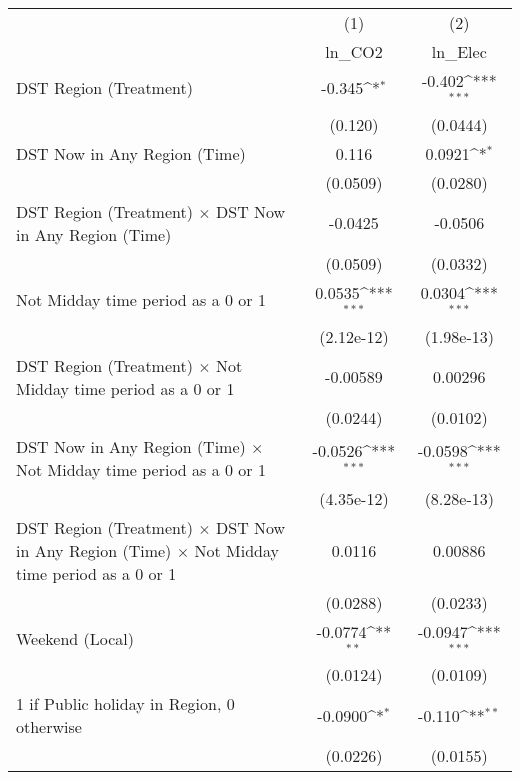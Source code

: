 {
\def\sym#1{\ifmmode^{#1}\else\(^{#1}\)\fi}
\begin{tabular}{l*{2}{c}}
\hline\hline
                    &\multicolumn{1}{c}{(1)}&\multicolumn{1}{c}{(2)}\\
                    &\multicolumn{1}{c}{ln\_CO2}&\multicolumn{1}{c}{ln\_Elec}\\
\hline
DST Region (Treatment)&      -0.345\sym{*}  &      -0.402\sym{***}\\
                    &     (0.120)         &    (0.0444)         \\
[1em]
DST Now in Any Region (Time)&       0.116         &      0.0921\sym{*}  \\
                    &    (0.0509)         &    (0.0280)         \\
[1em]
DST Region (Treatment) $\times$ DST Now in Any Region (Time)&     -0.0425         &     -0.0506         \\
                    &    (0.0509)         &    (0.0332)         \\
[1em]
Not Midday time period as a 0 or 1&      0.0535\sym{***}&      0.0304\sym{***}\\
                    &  (2.12e-12)         &  (1.98e-13)         \\
[1em]
DST Region (Treatment) $\times$ Not Midday time period as a 0 or 1&    -0.00589         &     0.00296         \\
                    &    (0.0244)         &    (0.0102)         \\
[1em]
DST Now in Any Region (Time) $\times$ Not Midday time period as a 0 or 1&     -0.0526\sym{***}&     -0.0598\sym{***}\\
                    &  (4.35e-12)         &  (8.28e-13)         \\
[1em]
DST Region (Treatment) $\times$ DST Now in Any Region (Time) $\times$ Not Midday time period as a 0 or 1&      0.0116         &     0.00886         \\
                    &    (0.0288)         &    (0.0233)         \\
[1em]
Weekend (Local)     &     -0.0774\sym{**} &     -0.0947\sym{***}\\
                    &    (0.0124)         &    (0.0109)         \\
[1em]
1 if Public holiday in Region, 0 otherwise&     -0.0900\sym{*}  &      -0.110\sym{**} \\
                    &    (0.0226)         &    (0.0155)         \\

\end{tabular}}
